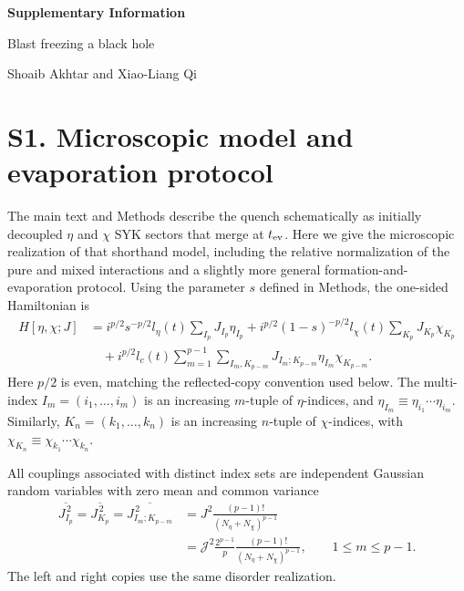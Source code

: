 \documentclass[11pt,a4paper]{article}
\begin{document}
\begin{center}
{\Large\bfseries Supplementary Information}\par\medskip
{\large Blast freezing a black hole}\par\medskip
Shoaib Akhtar and Xiao-Liang Qi
\end{center}
\bigskip
\section*{S1. Microscopic model and evaporation protocol}
The main text and Methods describe the quench schematically as initially
decoupled \(\eta\) and \(\chi\) SYK sectors that merge at \(t_{\rm ev}\). Here
we give the microscopic realization of that shorthand model, including the
relative normalization of the pure and mixed interactions and a slightly more
general formation-and-evaporation protocol. Using the parameter \(s\) defined
in Methods, the one-sided Hamiltonian is
\begin{equation}
\begin{aligned}
H[\eta,\chi;J]
&=
i^{p/2}s^{-p/2}l_\eta(t)
\sum_{I_p}J_{I_p}\eta_{I_p}
+
i^{p/2}(1-s)^{-p/2}l_\chi(t)
\sum_{K_p}J_{K_p}\chi_{K_p}
\\
&\quad
+i^{p/2}l_c(t)
\sum_{m=1}^{p-1}
\sum_{I_m,K_{p-m}}
J_{I_m;K_{p-m}}\eta_{I_m}\chi_{K_{p-m}} .
\end{aligned}
\label{eq:S-one-sided-H}
\end{equation}
Here \(p/2\) is even, matching the reflected-copy convention used below. The multi-index
\(I_m=(i_1,\ldots,i_m)\) is an increasing \(m\)-tuple of
\(\eta\)-indices, and
\(\eta_{I_m}\equiv\eta_{i_1}\cdots\eta_{i_m}\).
Similarly, \(K_n=(k_1,\ldots,k_n)\) is an increasing \(n\)-tuple of
\(\chi\)-indices, with
\(\chi_{K_n}\equiv\chi_{k_1}\cdots\chi_{k_n}\).

All couplings associated with distinct index sets are independent Gaussian
random variables with zero mean and common variance
\begin{equation}
\begin{aligned}
\overline{J_{I_p}^{\,2}}
=
\overline{J_{K_p}^{\,2}}
=
\overline{J_{I_m;K_{p-m}}^{\,2}}
&=
J^2\frac{(p-1)!}{(N_\eta+N_\chi)^{p-1}}
\\
&=
\mathcal J^2\frac{2^{p-1}}{p}
\frac{(p-1)!}{(N_\eta+N_\chi)^{p-1}},
\qquad 1\leq m\leq p-1 .
\end{aligned}
\label{eq:S-disorder}
\end{equation}
The left and right copies use the same disorder realization.
\end{document}

